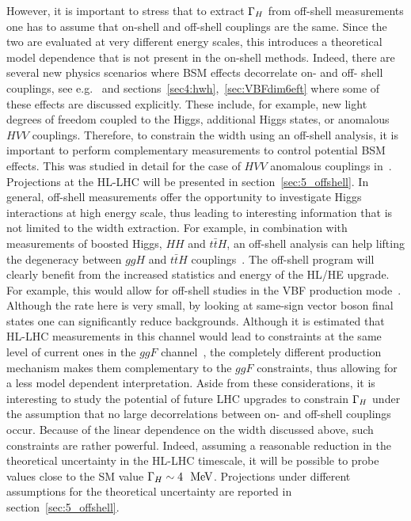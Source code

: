 However, it is important to stress that to extract ${\Gamma_H}$ from off-shell
measurements one has to assume that on-shell and off-shell couplings are the same. Since the two
are evaluated at very different energy scales, this introduces a theoretical model dependence that is not present in the on-shell methods. 
Indeed, there are several new physics scenarios where BSM effects decorrelate on- and off- shell 
couplings, see e.g.~\cite{Azatov:2014jga,Englert:2014aca,Logan:2014ppa,Englert:2014ffa} and sections~\ref{sec4:hwh},~\ref{sec:VBFdim6eft} where some of these effects are discussed explicitly. 
These include, for example, new light degrees of freedom coupled to the Higgs,
additional Higgs states, or anomalous $HVV$ couplings. Therefore, to constrain the width using an off-shell analysis,
 it is important to perform complementary measurements to control potential BSM effects. 
This was studied in detail for the case of $HVV$ anomalous couplings in~\cite{Anderson:2013afp}. 
 Projections at the HL-LHC will be presented in section~\ref{sec:5_offshell}. 
In general, off-shell measurements offer the opportunity to investigate Higgs interactions at 
high energy scale, thus leading to interesting information that is not limited to the width
extraction. For example, in combination with measurements of boosted Higgs, $HH$ and $t\bar tH$, 
an off-shell analysis can help lifting the degeneracy between $ggH$ and $t\bar tH$ 
couplings~\cite{Azatov:2014jga}. The off-shell program will clearly benefit from the 
increased statistics and energy of the HL/HE upgrade. For example, this would allow for 
off-shell studies in the VBF production mode~\cite{Campbell:2015vwa}. 
Although the rate here is very small,
by looking at same-sign vector boson final states one can significantly reduce backgrounds. 
%
Although it is estimated that HL-LHC measurements in this channel would lead to constraints
at the same level of current ones in the $ggF$ channel~\cite{Campbell:2015vwa}, 
the completely different 
production mechanism
makes them complementary to the $ggF$ constraints, thus allowing for a less model dependent
interpretation.
%
Aside from these considerations, it is interesting to study the potential of 
future LHC upgrades to constrain ${\Gamma_H}$ under the assumption that 
no large decorrelations between on- and off-shell couplings occur. Because of the linear dependence on
the width discussed above, such constraints are rather powerful. Indeed, assuming a reasonable
reduction in the theoretical uncertainty in the HL-LHC timescale, 
it will be possible to probe values close to the SM value
${\Gamma_H}\sim 4~{\rm ~\text{MeV}}$. Projections under different assumptions for the theoretical uncertainty
are reported in section~\ref{sec:5_offshell}. 

